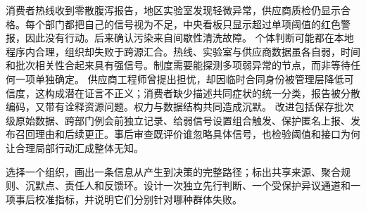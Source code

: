 消费者热线收到零散腹泻报告，地区实验室发现轻微异常，供应商质检仍显示合格。每个部门都把自己的信号视为不足，中央看板只显示超过单项阈值的红色警报，因此没有行动。后来确认污染来自间歇性清洗故障。 个体判断可能都在本地程序内合理，组织却失败于跨源汇合。热线、实验室与供应商数据虽各自弱，时间和批次相关性合起来具有强信号。制度需要能探测多项弱异常的节点，而非等待任何一项单独确定。 供应商工程师曾提出担忧，却因临时合同身份被管理层降低可信度，这构成潜在证言不正义；消费者缺少描述共同症状的统一分类，报告被分散编码，又带有诠释资源问题。权力与数据结构共同造成沉默。 改进包括保存批次级原始数据、跨部门例会前独立记录、给弱信号设置组合触发、保护匿名上报、发布召回理由和后续更正。事后审查既评价谁忽略具体信号，也检验阈值和接口为何让合理局部行动汇成整体无知。

\begin{tcolorbox}[breakable,colback=white,colframe=blue!30!black,title={本章研读任务},fonttitle=\bfseries]
选择一个组织，画出一条信息从产生到决策的完整路径；标出共享来源、聚合规则、沉默点、责任人和反馈环。设计一次独立先行判断、一个受保护异议通道和一项事后校准指标，并说明它们分别针对哪种群体失败。
\end{tcolorbox}
